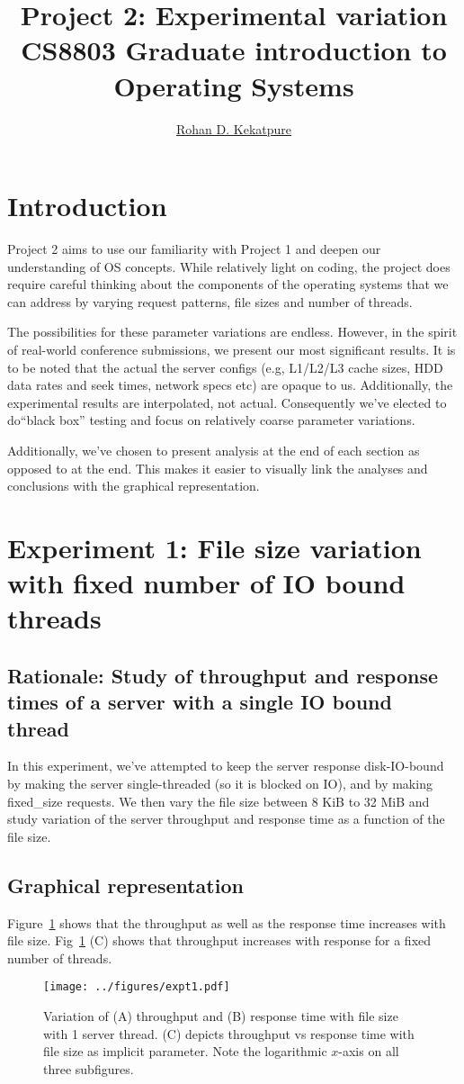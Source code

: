 \documentclass[11pt,letterpaper]{article}
\begin{document}
\title{Project 2: Experimental variation \\ {\small CS8803 Graduate introduction to Operating Systems}}
\author{\href{mailto:rdk@gatech.edu}{Rohan D. Kekatpure}}
\vspace{0.2cm}

\section*{Introduction}
Project 2 aims to use our familiarity with Project 1 and deepen our understanding of OS concepts. While relatively light on coding, the project does require careful thinking about the components of the operating systems that we can address by varying request patterns, file sizes and number of threads. 

The possibilities for these parameter variations are endless. However, in the spirit of real-world conference submissions, we present our most significant results. It is to be noted that the actual the server configs (e.g, L1/L2/L3 cache sizes, HDD data rates and seek times, network specs etc) are opaque to us. Additionally, the experimental results are interpolated, not actual. Consequently we've elected to do``black box'' testing and focus on relatively coarse parameter variations. 

Additionally, we've chosen to present analysis at the end of each section as opposed to at the end. This makes it easier to visually link the analyses and conclusions with the graphical representation. 
\section{Experiment 1: File size variation with fixed number of IO bound threads}
\subsection{Rationale: Study of throughput and response times of a server with a single IO bound thread}
In this experiment, we've attempted to keep the server response disk-IO-bound by making the server single-threaded (so it is blocked on IO), and by making {\sc fixed_size} requests. We then vary the file size between 8 KiB to 32 MiB and study variation of the server throughput and response time as a function of the file size.
\subsection{Graphical representation}
Figure~\ref{fig:expt1} shows that the throughput as well as the response time increases with file size. Fig~\ref{fig:expt1} (C) shows that throughput increases with response for a fixed number of threads.
\begin{figure}[!htb]
\centering
\texttt{[image: ../figures/expt1.pdf]}
\caption{Variation of (A) throughput and (B) response time with file size with 1 server thread. (C) depicts throughput vs response time with file size as implicit parameter. Note the logarithmic $x$-axis on all three subfigures.\label{fig:expt1}}
\end{figure}
\end{document}
